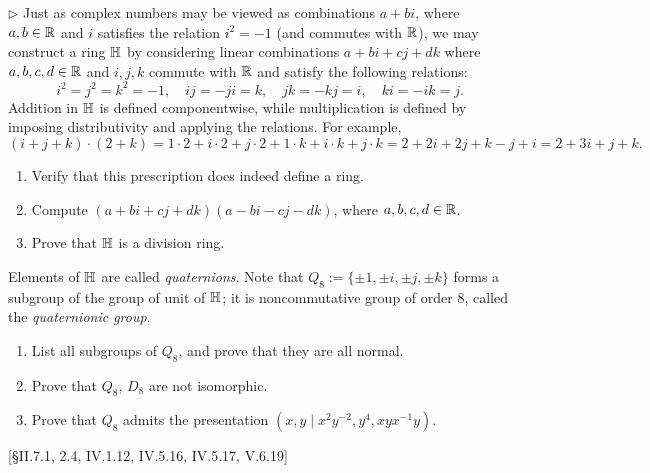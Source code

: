 \begin{problem}
	$\triangleright$ Just as complex numbers may be viewed as combinations $a + bi$, where $a, b \in \mathbb{R}$ and $i$ satisfies the relation $i^2 = -1$ (and commutes with $\mathbb{R}$), we may construct a ring $\mathbb{H}$ by considering linear combinations $a + bi + cj  + dk$ where $a, b, c, d \in \mathbb{R}$ and $i, j, k$ commute with $\mathbb{R}$ and satisfy the following relations:
	\[
		i^2 = j^2 = k^2 = -1, \quad ij = -ji = k, \quad jk = -kj = i, \quad ki = -ik = j \text{.}
	\]
	Addition in $\mathbb{H}$ is defined componentwise, while multiplication is defined by imposing distributivity and applying the relations. For example,
	\[
		(i + j + k) \cdot (2 + k) = 1 \cdot 2 + i \cdot 2 + j \cdot 2 + 1 \cdot k + i \cdot k + j \cdot k = 2 + 2i + 2j + k - j + i = 2 + 3i + j + k \text{.}
	\]
	\begin{enumerate}[label=(\roman*)]
		\item Verify that this prescription does indeed define a ring.
		\item Compute $(a+bi+cj+dk)(a-bi-cj-dk)$, where $a, b, c, d \in \mathbb{R}$.
		\item Prove that $\mathbb{H}$ is a division ring.
	\end{enumerate}
	Elements of $\mathbb{H}$ are called \emph{quaternions}. Note that $Q_8 := \{\pm 1, \pm i, \pm j, \pm k\}$ forms a subgroup of the group of unit of $\mathbb{H}$; it is noncommutative group of order $8$, called the \emph{quaternionic group}.
	\begin{enumerate}[label=(\roman*),resume]
		\item List all subgroups of $Q_8$, and prove that they are all normal.
		\item Prove that $Q_8$, $D_8$ are not isomorphic.
		\item Prove that $Q_8$ admits the presentation $(x, y \mid x^2 y^{-2}, y^4, xyx^{-1}y)$.
	\end{enumerate}
	[\S II.7.1, 2.4, IV.1.12, IV.5.16, IV.5.17, V.6.19]
\end{problem}

